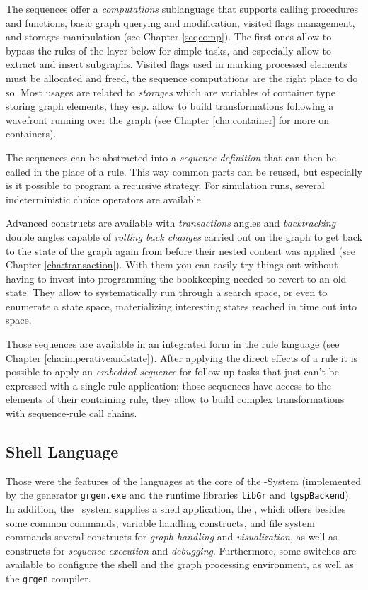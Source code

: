 The sequences offer a \emph{computations} sublanguage that supports calling procedures and functions, basic graph querying and modification, visited flags management, and storages manipulation (see Chapter \ref{seqcomp}).
The first ones allow to bypass the rules of the layer below for simple tasks, and especially allow to extract and insert subgraphs. 
Visited flags used in marking processed elements must be allocated and freed, the sequence computations are the right place to do so.
Most usages are related to \emph{storages} which are variables of container type storing graph elements, they esp. allow to build transformations following a wavefront running over the graph (see Chapter \ref{cha:container} for more on containers).

The sequences can be abstracted into a \emph{sequence definition} that can then be called in the place of a rule.
This way common parts can be reused, but especially is it possible to program a recursive strategy.
For simulation runs, several indeterministic choice operators are available.

Advanced constructs are available with \emph{transactions} angles and \emph{backtracking} double angles capable of \emph{rolling back changes} carried out on the graph to get back to the state of the graph again from before their nested content was applied (see Chapter \ref{cha:transaction}).
With them you can easily try things out without having to invest into programming the bookkeeping needed to revert to an old state.
They allow to systematically run through a search space, or even to enumerate a state space, materializing interesting states reached in time out into space.

Those sequences are available in an integrated form in the rule language (see Chapter \ref{cha:imperativeandstate}).
After applying the direct effects of a rule it is possible to apply an \emph{embedded sequence} for follow-up tasks that just can't be expressed with a single rule application; those sequences have access to the elements of their containing rule, they allow to build complex transformations with sequence-rule call chains.
		
\subsection{Shell Language}
Those were the features of the languages at the core of the \GrG-System (implemented by the generator \texttt{grgen.exe} and the runtime libraries \texttt{libGr} and \texttt{lgspBackend}).
In addition, the \GrG\ system supplies a shell application, the \GrShell,
which offers besides some common commands, variable handling constructs, and file system commands several constructs for \emph{graph handling} and \emph{visualization}, as well as constructs for \emph{sequence execution} and \emph{debugging}.
Furthermore, some switches are available to configure the shell and the graph processing environment, as well as the \texttt{grgen} compiler.

